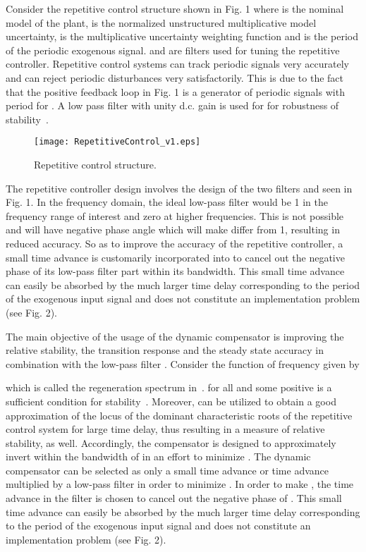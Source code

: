 \documentclass[12pt,draftcls,onecolumn]{IEEEtran}
\begin{document}
Consider the repetitive control structure shown in Fig. 1 where
 is the nominal model of the plant,  is the
normalized unstructured multiplicative model uncertainty, 
is the multiplicative uncertainty weighting function and
 is the period of the periodic exogenous signal. 
and  are filters used for tuning the repetitive controller.
Repetitive control systems can track periodic signals very
accurately and can reject periodic disturbances very
satisfactorily. This is due to the fact that the positive feedback
loop in Fig. 1 is a generator of periodic signals with period
 for . A low pass filter with unity d.c. gain is
used for  for robustness of stability~\cite{HYO+:88, WeH:99}.

\begin{figure}\centering
    \texttt{[image: RepetitiveControl\_v1.eps]}\\
    \caption{Repetitive control structure.}\end{figure}


The repetitive controller design involves the design of the two
filters  and  seen in Fig. 1. In the frequency domain,
the ideal low-pass filter  would be 1 in the frequency
range of interest and zero at higher frequencies. This is not
possible and  will have negative phase angle which
will make  differ from 1, resulting in reduced
accuracy. So as to improve the accuracy of the repetitive
controller, a small time advance is customarily incorporated into
 to cancel out the negative phase of its low-pass filter
part within its bandwidth. This small time advance can easily be
absorbed by the much larger time delay  corresponding to
the period of the exogenous input signal and does not constitute
an implementation problem (see Fig. 2).

The main objective of the usage of the dynamic compensator  is improving the relative stability, the transition response and the steady state accuracy in combination with the low-pass filter . Consider the function of frequency given by

which is called the regeneration spectrum in~\cite{SrS:91}.  for all  and some positive
 is a sufficient condition for stability~\cite{SrS:91}. Moreover,  can be utilized to obtain a good approximation of the locus of the dominant characteristic roots of the repetitive control system for large time delay, thus resulting in a measure
of relative stability, as well. Accordingly, the compensator  is designed to approximately invert  within the
bandwidth of in an effort to minimize . The dynamic compensator  can be selected as only a small time advance or
time advance multiplied by a low-pass filter in order to minimize . In order to make , the time advance in the filter  is chosen to cancel out the negative phase of . This small time advance can easily be absorbed by the
much larger time delay  corresponding to the period of the exogenous input signal and does not constitute an implementation
problem (see Fig. 2).
\end{document}
